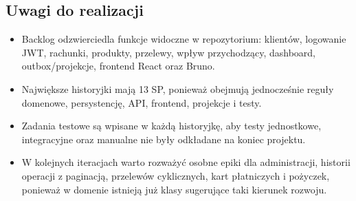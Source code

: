 \documentclass[12pt,a4paper]{article}
\begin{document}
\subsection*{Uwagi do realizacji}

\begin{itemize}
\item Backlog odzwierciedla funkcje widoczne w repozytorium: klientów, logowanie JWT, rachunki, produkty, przelewy, wpływ przychodzący, dashboard, outbox/projekcje, frontend React oraz Bruno.
\item Największe historyjki mają 13 SP, ponieważ obejmują jednocześnie reguły domenowe, persystencję, API, frontend, projekcje i testy.
\item Zadania testowe są wpisane w każdą historyjkę, aby testy jednostkowe, integracyjne oraz manualne nie były odkładane na koniec projektu.
\item W kolejnych iteracjach warto rozważyć osobne epiki dla administracji, historii operacji z paginacją, przelewów cyklicznych, kart płatniczych i pożyczek, ponieważ w domenie istnieją już klasy sugerujące taki kierunek rozwoju.
\end{itemize}
\end{document}
